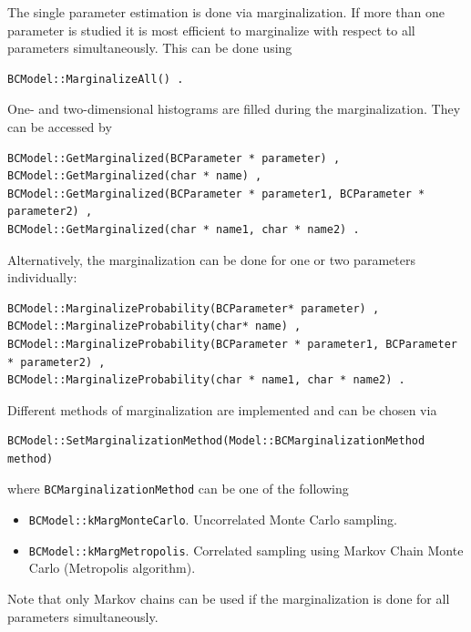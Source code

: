 \documentclass[11pt, a4paper]{article}
\begin{document}
\noindent 
The single parameter estimation is done via marginalization. If more
than one parameter is studied it is most efficient to marginalize with
respect to all parameters simultaneously. This can be done using
%
\begin{verbatim}
BCModel::MarginalizeAll() . 
\end{verbatim} 

\noindent 
One- and two-dimensional histograms are filled during the
marginalization. They can be accessed by
%
\begin{verbatim}
BCModel::GetMarginalized(BCParameter * parameter) ,
BCModel::GetMarginalized(char * name) ,
BCModel::GetMarginalized(BCParameter * parameter1, BCParameter * parameter2) ,
BCModel::GetMarginalized(char * name1, char * name2) .
\end{verbatim}

\noindent 
Alternatively, the marginalization can be done for one or two
parameters individually: 
%
\begin{verbatim}
BCModel::MarginalizeProbability(BCParameter* parameter) ,
BCModel::MarginalizeProbability(char* name) , 
BCModel::MarginalizeProbability(BCParameter * parameter1, BCParameter * parameter2) ,
BCModel::MarginalizeProbability(char * name1, char * name2) .
\end{verbatim} 

\noindent 
Different methods of marginalization are implemented and can be chosen
via
%
\begin{verbatim}
BCModel::SetMarginalizationMethod(Model::BCMarginalizationMethod method)
\end{verbatim} 

\noindent
where \verb|BCMarginalizationMethod| can be one of the following 
% 
\begin{itemize}
\item \verb|BCModel::kMargMonteCarlo|. Uncorrelated Monte Carlo sampling.
\item \verb|BCModel::kMargMetropolis|. Correlated sampling using
  Markov Chain Monte Carlo (Metropolis algorithm).
\end{itemize} 

\noindent 
Note that only Markov chains can be used if the marginalization is
done for all parameters simultaneously. \\

\end{document}
